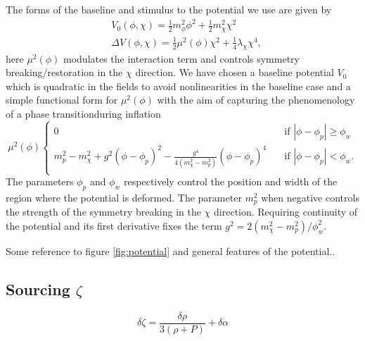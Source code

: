 The forms of the baseline and stimulus to the potential we use are given by
\begin{align} \label{eq:potential}
  &V_0(\phi,\chi) = \frac{1}{2}m^2_\phi\phi^2 + \frac{1}{2}m^2_\chi\chi^2 \\
  &\Delta V(\phi,\chi) = \frac{1}{2}\mu^2(\phi)\chi^2 + \frac{1}{4}\lambda_\chi\chi^4,
\end{align} 
here $\mu^2(\phi)$ modulates the interaction term and controls symmetry breaking/restoration in the $\chi$ direction.
We have chosen a baseline potential $V_0$ which is quadratic in the fields to avoid nonlinearities in the baseline case and a simple functional form for $\mu^2(\phi)$ with the aim of capturing the phenomenology of a phase transitionduring inflation
\begin{equation} \label{eq:m2 eff}
  \mu^2(\phi)
  \begin{cases}
    0 & \quad \text{if } |\phi-\phi_p|\ge\phi_w \\
    m^2_p - m^2_\chi + g^2(\phi-\phi_p)^2 -\frac{g^4}{4(m^2_\chi-m^2_p)}(\phi-\phi_p)^4 & \quad \text{if } |\phi-\phi_p|<\phi_w. \\
  \end{cases}
\end{equation} 
The parameters $\phi_p$ and $\phi_w$ respectively control the position and width of the region where the potential is deformed.
The parameter $m^2_p$ when negative controls the strength of the symmetry breaking in the $\chi$ direction.
Requiring continuity of the potential and its first derivative fixes the term $g^2=2(m^2_\chi-m^2_p)/\phi_w^2$.


Some reference to figure \ref{fig:potential} and general features of the potential..

\subsection{Sourcing $\zeta$}


\begin{equation} \label{eq:zeta differential}
  \delta\zeta = \frac{\delta\rho}{3(\rho + P)} + \delta\alpha
\end{equation} 

